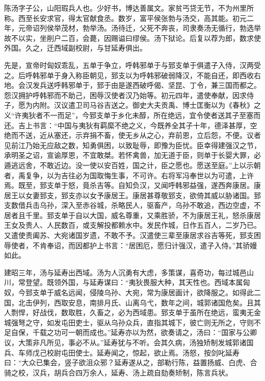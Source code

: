 \documentclass[]{article}
\begin{document}
陈汤字子公，山阳瑕兵人也。少好书，博达善属文。家贫丐贷无节，不为州里所称。西至长安求官，得太官献食丞。数岁，富平侯张勃与汤交，高其能。初元二年，元帝诏列侯举茂材，勃举汤。汤待迁，父死不奔丧，司隶奏汤无循行，勃选举故不以实，坐削户二百，会薨，因赐谥曰缪侯。汤下狱论。后复以荐为郎，数求使外国。久之，迁西域副校尉，与甘延寿俱出。

先是，宣帝时匈奴乖乱，五单于争立，呼韩邪单于与郅支单于俱遣子入侍，汉两受之。后呼韩邪单于身入称臣朝见，郅支以为呼韩邪破弱降汉，不能自还，即西收右地。会汉发兵送呼韩邪单于，郅于由是遂西破呼偈、坚昆、丁令，兼三国而都之。怨汉拥护呼韩邪而不助己，困辱汉使者汉乃始等。初元四年，遣使奉献，因求侍子，愿为内附。汉议遣卫司马谷吉送之。御史大夫贡禹、博士匡衡以为《春秋》之义``许夷狄者不一而足''，今郅支单于乡化未醇，所在绝远，宜令使者送其子至塞而还。吉上书言：``中国与夷狄有羁縻不绝之义，今既养全其子十年，德泽甚厚，空绝而不送，近从塞还，示弃捐不畜，使无乡从之心，弃前恩，立后怨，不便。议者见前江乃始无应敌之数，知勇俱困，以致耻辱，即豫为臣忧。臣幸得建强汉之节，承明圣之诏，宣谕厚恩，不宜敢桀。若怀禽兽，加无道于臣，则单于长婴大罪，必遁逃远舍，不敢近边。没一使以安百姓，国之计，臣之愿也。愿送至庭。''上以示朝者，禹复争，以为吉往必为国取悔生事，不可许。右将军冯奉世以为可遣，上许焉。既至，郅支单于怒，竟杀吉等。自知负汉，又闻呼韩邪益强，遂西奔康居。康居王以女妻郅支，郅支亦以女予康居王。康居甚尊敬郅支，欲倚其威以胁诸国。郅支数借兵击乌孙，深入至赤谷城，杀略民人，驱畜产，乌孙不敢追，西边空虚，不居者且千里。郅支单于自以大国，威名尊重，又乘胜骄，不为康居王礼，怒杀康居王女及贵人、人民数百，或支解投都赖水中。发民作城，日作五百人，二岁乃已。又遣使责阖苏、大宛诸国岁遗，不敢不予。汉遣使三辈至康居求谷吉等死，郅支困辱使者，不肯奉诏，而因都护上书言：``居困厄，愿归计强汉，遣子入侍。''其骄嫚如此。

建昭三年，汤与延寿出西域。汤为人沉勇有大虑，多策谋，喜奇功，每过城邑山川，常登望。既领外国，与延寿谋曰：``夷狄畏服大种，其天性也。西域本属匈奴，今郅支单于威名远闻，侵陵乌孙、大宛，常为康居画计，欲降服之。如得此二国，北击伊列，西取安息，南排月氏、山离乌弋，数年之间，城郭诸国危矣。且其人剽悍，好战伐，数取胜，久畜之，必为西域患。郅支单于虽所在绝远，蛮夷无金城强弩之守，如发屯田吏士，驱从乌孙众兵，直指其城下，彼亡则无所之，守则不足自保，千载之功可一朝而成也。''延寿亦以为然，欲奏请之，汤曰：``国家与公卿议，大策非凡所见，事必不从。''延寿犹与不听。会其久病，汤独矫制发城郭诸国兵、车师戊己校尉屯田使士。延寿闻之，惊起，欲止焉。汤怒，按剑叱延寿曰：``大众已集会，竖子欲沮众邪？延寿遂从之，部勒行陈，益置扬威、白虎、合骑之校，汉兵，胡兵合四万余人，延寿、汤上疏自劾奏矫制，陈言兵状。
\end{document}
